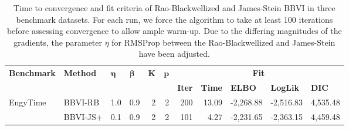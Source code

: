 \documentclass{article}
\begin{document}
\begin{table}[ht]
\caption{Time to convergence and fit criteria of Rao-Blackwellized and James-Stein BBVI in three benchmark datasets. For each run, we force the algorithm to take at least 100 iterations before assessing convergence to allow ample warm-up. Due to the differing magnitudes of the gradients, the parameter $\eta$ for RMSProp between the Rao-Blackwellized and James-Stein have been adjusted.}
\label{tab:benchmarks}
\centering
{\small
\begin{tabular}{llrrrrrrrrr}
\hline
\multirow{2}{*}{\textbf{Benchmark}} & \multirow{2}{*}{\textbf{Method}} & \multicolumn{1}{l}{\multirow{2}{*}{\textbf{$\pmb{\eta}$}}} & \multicolumn{1}{l}{\multirow{2}{*}{\textbf{$\pmb{\beta}$}}} & \multicolumn{1}{l}{\multirow{2}{*}{$\mathbf{K}$}} & \multicolumn{1}{l}{\multirow{2}{*}{$\mathbf{p}$}} & \multicolumn{5}{c}{\textbf{Fit}}                                                                                                                                                   \\ \cline{7-11} 
                                    &                                  & \multicolumn{1}{l}{}                              & \multicolumn{1}{l}{}                               & \multicolumn{1}{l}{}                            & \multicolumn{1}{l}{}                            & \multicolumn{1}{l}{\textbf{Iter}} & \multicolumn{1}{l}{\textbf{Time}} & \multicolumn{1}{l}{\textbf{ELBO}} & \multicolumn{1}{l}{\textbf{LogLik}} & \multicolumn{1}{l}{\textbf{DIC}} \\ \hline
\multirow{2}{*}{EngyTime}           & BBVI-RB                          & 1.0                                               & 0.9                                                & 2                                               & 2                                               & 200                               & 13.09                             & -2,268.88                         & -2,516.83                           & 4,535.48                         \\
                                    & BBVI-JS+                           & 0.1                                               & 0.9                                                & 2                                               & 2                                               & 101                               & 4.27                              & -2,231.65                         & -2,363.15                           & 4,459.48                         \\ \hline

\end{tabular}}
\end{table}
\end{document}
